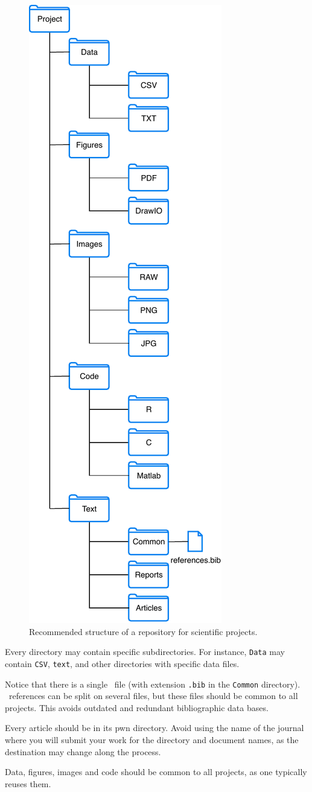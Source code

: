 \documentclass[journal,twopage]{IEEEtran}
\begin{document}
\begin{figure}[hbt]
	\centering
	\includegraphics[width=.35\columnwidth]{DirectoryStructure}
	\caption{Recommended structure of a repository for scientific projects.}\label{Fig:StructRepo}
\end{figure}

Every directory may contain specific subdirectories.
For instance, \verb|Data| may contain \verb|CSV|, \verb|text|, and other directories with specific data files.

Notice that there is a single \BibTeX\ file (with extension \verb|.bib| in the \verb|Common| directory).
\BibTeX\ references can be split on several files, but these files should be common to all projects.
This avoids outdated and redundant bibliographic data bases.

Every article should be in its pwn directory.
Avoid using the name of the journal where you will submit your work for the directory and document names, as the destination may change along the process.

Data, figures, images and code should be common to all projects, as one typically reuses them.
\end{document}
